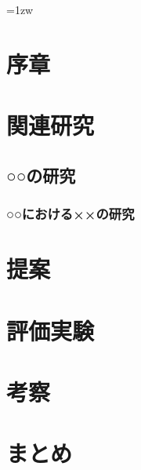 \documentclass[a4paper]{jreport}
\subtitle{—図書館情報メディア研究科の場合—}{: A Case Study at the Graduate School of Library, Information, and Media Studies}
\begin{document}
\makecover

\addtolength{\textheight}{-5mm}	%
\setlength{\footskip}{15mm}	%
\fontsize{11pt}{15pt}\selectfont

\newpage
\raggedright
{} %
\tableofcontents
\listoffigures

\parindent=1zw	%
\pagebreak\setcounter{page}{1}
\pagestyle{plain}


\chapter{序章}

\chapter{関連研究}
\section{○○の研究}
\subsection{○○における××の研究}

\chapter{提案}

\chapter{評価実験}

\chapter{考察}

\chapter{まとめ}
\end{document}
